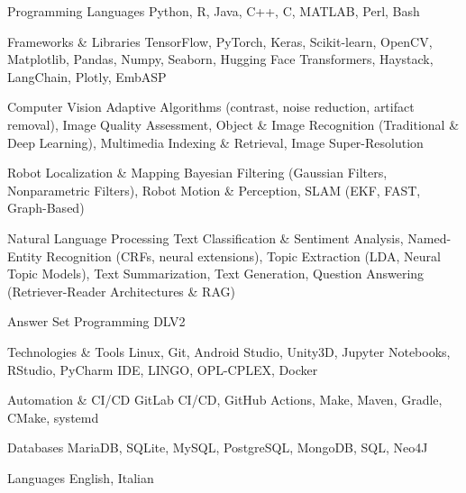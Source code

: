 

\begin{cvskills}
    
\cvskill
{Programming Languages}
{Python, R, Java, C++, C, MATLAB, Perl, Bash}

\cvskill
{Frameworks \& Libraries}
{TensorFlow, PyTorch, Keras, Scikit-learn, OpenCV, Matplotlib, Pandas, Numpy, Seaborn, Hugging Face Transformers, Haystack, LangChain, Plotly, EmbASP}

\cvskill
{Computer Vision}
{Adaptive Algorithms (contrast, noise reduction, artifact removal), Image Quality Assessment, Object \& Image Recognition (Traditional \& Deep Learning), Multimedia Indexing \& Retrieval, Image Super-Resolution}

\cvskill
{Robot Localization \& Mapping}
{Bayesian Filtering (Gaussian Filters, Nonparametric Filters), Robot Motion \& Perception, SLAM (EKF, FAST, Graph-Based)}

\cvskill
{Natural Language Processing}
{Text Classification \& Sentiment Analysis, Named-Entity Recognition (CRFs, neural extensions), Topic Extraction (LDA, Neural Topic Models), Text Summarization, Text Generation, Question Answering (Retriever-Reader Architectures \& RAG)}

\cvskill
{Answer Set Programming}
{DLV2}

\cvskill
{Technologies \& Tools}
{Linux, Git, Android Studio, Unity3D, Jupyter Notebooks, RStudio, PyCharm IDE, LINGO, OPL-CPLEX, Docker}

\cvskill
{Automation \& CI/CD}
{GitLab CI/CD, GitHub Actions, Make, Maven, Gradle, CMake, systemd}

\cvskill
{Databases}
{MariaDB, SQLite, MySQL, PostgreSQL, MongoDB, SQL, Neo4J}

\cvskill
{Languages}
{English, Italian}

\end{cvskills}

